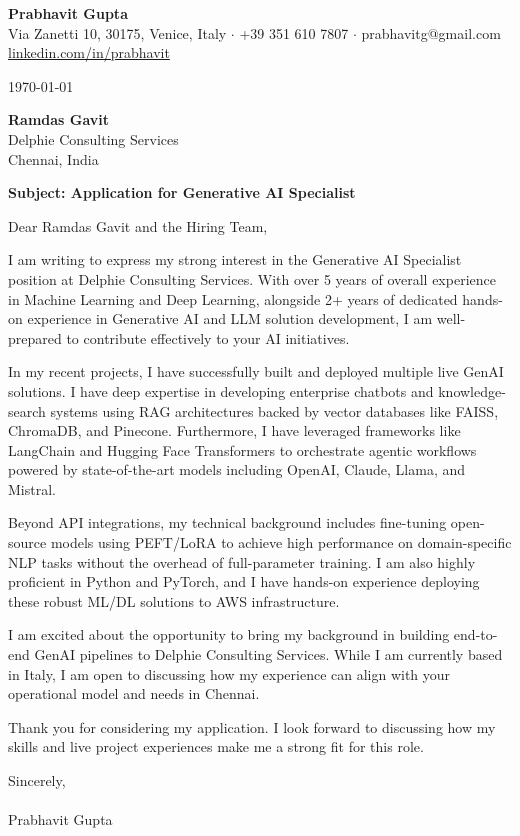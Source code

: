 \documentclass[11pt,a4paper]{article}
\begin{document}
\pagestyle{empty}

\begin{center}
    {\LARGE \textbf{Prabhavit Gupta}} \\
    \vspace{2mm}
    Via Zanetti 10, 30175, Venice, Italy $\cdot$ +39 351 610 7807 $\cdot$ prabhavitg@gmail.com \\
    \href{https://www.linkedin.com/in/prabhavit/}{linkedin.com/in/prabhavit}
\end{center}

\vspace{2em}

\today

\textbf{Ramdas Gavit} \\
Delphie Consulting Services \\
Chennai, India

\vspace{1.5em}

\textbf{Subject: Application for Generative AI Specialist}

\vspace{1.5em}

Dear Ramdas Gavit and the Hiring Team,

I am writing to express my strong interest in the Generative AI Specialist position at Delphie Consulting Services. With over 5 years of overall experience in Machine Learning and Deep Learning, alongside 2+ years of dedicated hands-on experience in Generative AI and LLM solution development, I am well-prepared to contribute effectively to your AI initiatives.

In my recent projects, I have successfully built and deployed multiple live GenAI solutions. I have deep expertise in developing enterprise chatbots and knowledge-search systems using RAG architectures backed by vector databases like FAISS, ChromaDB, and Pinecone. Furthermore, I have leveraged frameworks like LangChain and Hugging Face Transformers to orchestrate agentic workflows powered by state-of-the-art models including OpenAI, Claude, Llama, and Mistral.

Beyond API integrations, my technical background includes fine-tuning open-source models using PEFT/LoRA to achieve high performance on domain-specific NLP tasks without the overhead of full-parameter training. I am also highly proficient in Python and PyTorch, and I have hands-on experience deploying these robust ML/DL solutions to AWS infrastructure.

I am excited about the opportunity to bring my background in building end-to-end GenAI pipelines to Delphie Consulting Services. While I am currently based in Italy, I am open to discussing how my experience can align with your operational model and needs in Chennai.

Thank you for considering my application. I look forward to discussing how my skills and live project experiences make me a strong fit for this role.

Sincerely, \\
\vspace{1em} \\
Prabhavit Gupta
\end{document}
